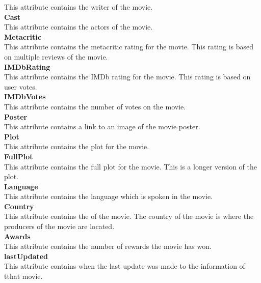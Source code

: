 This attribute contains the writer of the movie. \\
 \textbf{Cast} \\
This attribute contains the actors of the movie.\\
 \textbf{Metacritic} \\
This attribute contains the metacritic rating for the movie. 
This rating is based on multiple reviews of the movie.\\
 \textbf{IMDbRating} \\
This attribute contains the IMDb rating for the movie.
This rating is based on user votes. \\
 \textbf{IMDbVotes} \\
This attribute contains the number of votes on the movie. \\
 \textbf{Poster} \\
This attribute contains a link to an image of the movie poster. \\
 \textbf{Plot} \\
This attribute contains the plot for the movie. \\
 \textbf{FullPlot} \\
This attribute contains the full plot for the movie. 
This is a longer version of the plot. \\
 \textbf{Language} \\
This attribute contains the language which is spoken in the movie. \\
 \textbf{Country} \\
This attribute contains the of the movie.
The country of the movie is where the producers of the movie are located. \\
 \textbf{Awards} \\
This attribute contains the number of rewards the movie has won. \\
 \textbf{lastUpdated} \\
This attribute contains when the last update was made to the information of tthat movie. \\




